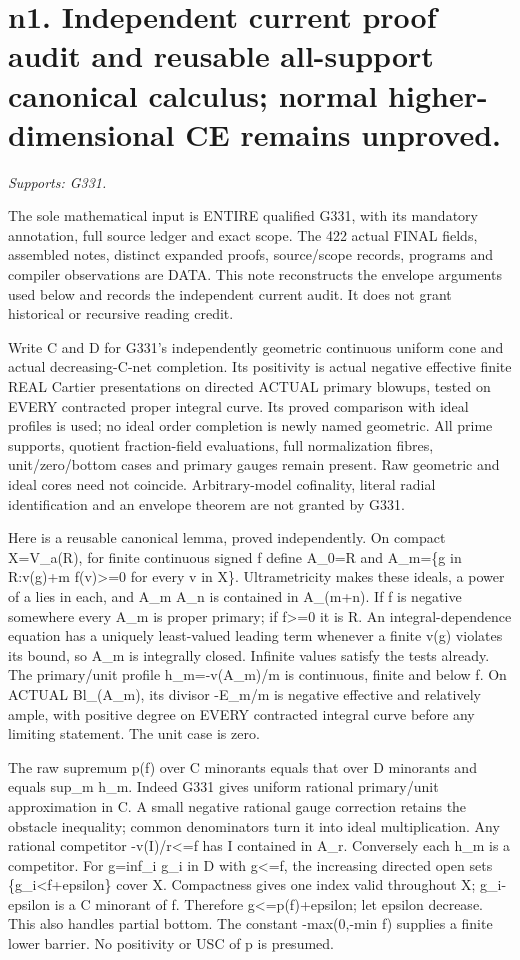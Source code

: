 \section{n1. Independent current proof audit and reusable all-support canonical calculus; normal higher-dimensional CE remains unproved.}
\textit{Supports: G331.}

The sole mathematical input is ENTIRE qualified G331, with its mandatory annotation, full source ledger and exact scope. The 422 actual FINAL fields, assembled notes, distinct expanded proofs, source/scope records, programs and compiler observations are DATA. This note reconstructs the envelope arguments used below and records the independent current audit. It does not grant historical or recursive reading credit.

Write C and D for G331's independently geometric continuous uniform cone and actual decreasing-C-net completion. Its positivity is actual negative effective finite REAL Cartier presentations on directed ACTUAL primary blowups, tested on EVERY contracted proper integral curve. Its proved comparison with ideal profiles is used; no ideal order completion is newly named geometric. All prime supports, quotient fraction-field evaluations, full normalization fibres, unit/zero/bottom cases and primary gauges remain present. Raw geometric and ideal cores need not coincide. Arbitrary-model cofinality, literal radial identification and an envelope theorem are not granted by G331.

Here is a reusable canonical lemma, proved independently. On compact X=V\_a(R), for finite continuous signed f define A\_0=R and A\_m=\{g in R:v(g)+m f(v)\textgreater{}=0 for every v in X\}. Ultrametricity makes these ideals, a power of a lies in each, and A\_m A\_n is contained in A\_(m+n). If f is negative somewhere every A\_m is proper primary; if f\textgreater{}=0 it is R. An integral-dependence equation has a uniquely least-valued leading term whenever a finite v(g) violates its bound, so A\_m is integrally closed. Infinite values satisfy the tests already. The primary/unit profile h\_m=-v(A\_m)/m is continuous, finite and below f. On ACTUAL Bl\_(A\_m), its divisor -E\_m/m is negative effective and relatively ample, with positive degree on EVERY contracted integral curve before any limiting statement. The unit case is zero.

The raw supremum p(f) over C minorants equals that over D minorants and equals sup\_m h\_m. Indeed G331 gives uniform rational primary/unit approximation in C. A small negative rational gauge correction retains the obstacle inequality; common denominators turn it into ideal multiplication. Any rational competitor -v(I)/r\textless{}=f has I contained in A\_r. Conversely each h\_m is a competitor. For g=inf\_i g\_i in D with g\textless{}=f, the increasing directed open sets \{g\_i\textless{}f+epsilon\} cover X. Compactness gives one index valid throughout X; g\_i-epsilon is a C minorant of f. Therefore g\textless{}=p(f)+epsilon; let epsilon decrease. This also handles partial bottom. The constant -max(0,-min f) supplies a finite lower barrier. No positivity or USC of p is presumed.


